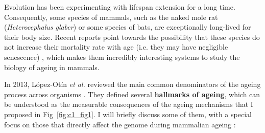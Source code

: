 \bigskip

Evolution has been experimenting with lifespan extension for a long time. Consequently, some species of mammals, such as the naked mole rat (\textit{Heterocephalus glaber}) or some species of bats, are exceptionally long-lived for their body size. Recent reports point towards the possibility that these species do not increase their mortality rate with age (i.e. they may have negligible senescence) \cite{Ruby2018,Fleischer2017}, which makes them incredibly interesting systems to study the biology of ageing in mammals. 

\bigskip

In 2013, L\'opez-Ot\'in \textit{et al.} reviewed the main common denominators of the ageing process across organisms \cite{Lopez-Otin2013}. They defined several \textbf{hallmarks of ageing}, which can be understood as the measurable consequences of the ageing mechanisms that I proposed in Fig~\ref{fig:c1_fig1}. I will briefly discuss some of them, with a special focus on those that directly affect the genome during mammalian ageing  \cite{Lopez-Otin2013,Singh2019}:

